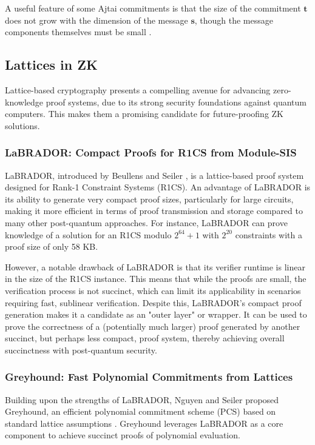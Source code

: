 A useful feature of some Ajtai commitments is that the size of the
commitment $\mathbf{t}$ does not grow with the dimension of the
message $\mathbf{s}$, though the message components themselves must be
small \cite{LatticesInZKP}.

\subsection{Lattices in ZK}

Lattice-based cryptography presents a compelling avenue for advancing
zero-knowledge proof systems, due to its strong security foundations
against quantum computers. This makes them a promising candidate for
future-proofing ZK solutions.

\subsubsection{LaBRADOR: Compact Proofs for R1CS from Module-SIS}

LaBRADOR, introduced by Beullens and Seiler \cite{LaBRADOR}, is a lattice-based
proof system designed for Rank-1 Constraint Systems (R1CS). An advantage of
LaBRADOR is its ability to generate very compact proof sizes, particularly for
large circuits, making it more efficient in terms of proof transmission and
storage compared to many other post-quantum approaches. For instance, LaBRADOR
can prove knowledge of a solution for an R1CS modulo $2^{64} + 1$ with
$2^{20}$ constraints with a proof size of only 58 KB.

However, a notable drawback of LaBRADOR is that its verifier runtime is linear
in the size of the R1CS instance. This means that while the proofs are small,
the verification process is not succinct, which can limit its applicability in
scenarios requiring fast, sublinear verification. Despite this, LaBRADOR's
compact proof generation makes it a candidate as an "outer layer" or wrapper.
It can be used to prove the correctness of a (potentially much larger) proof
generated by another succinct, but perhaps less compact, proof system, thereby
achieving overall succinctness with post-quantum security.

\subsubsection{Greyhound: Fast Polynomial Commitments from Lattices}

Building upon the strengths of LaBRADOR, Nguyen and Seiler proposed Greyhound,
an efficient polynomial commitment scheme (PCS) based on standard
lattice assumptions \cite{Greyhound}. Greyhound leverages LaBRADOR as a core
component to achieve succinct proofs of polynomial evaluation.

